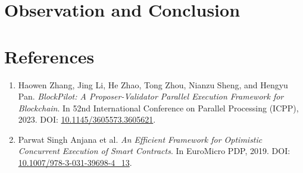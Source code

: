 \documentclass[12pt]{article}
\begin{document}
\section{Observation and Conclusion}


\section{References}

\begin{enumerate}
    \item Haowen Zhang, Jing Li, He Zhao, Tong Zhou, Nianzu Sheng, and Hengyu Pan. \textit{BlockPilot: A Proposer-Validator Parallel Execution Framework for Blockchain}. In 52nd International Conference on Parallel Processing (ICPP), 2023. DOI: \href{https://doi.org/10.1145/3605573.3605621}{10.1145/3605573.3605621}.
    \item Parwat Singh Anjana et al. \textit{An Efficient Framework for Optimistic Concurrent Execution of Smart Contracts}. In EuroMicro PDP, 2019. DOI: \href{https://doi.org/10.1007/978-3-031-39698-4_13}{10.1007/978-3-031-39698-4\_13}.
\end{enumerate}
\end{document}
